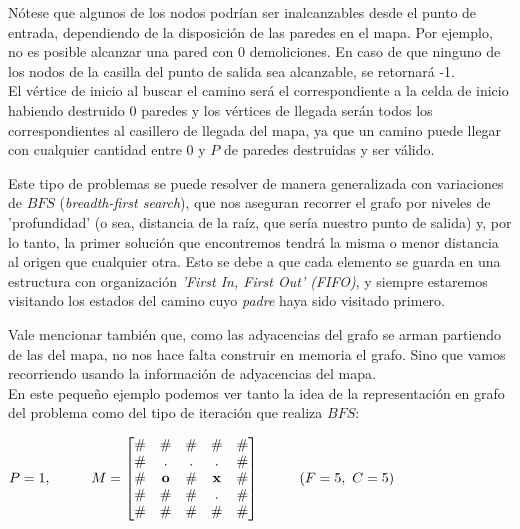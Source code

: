Nótese que algunos de los nodos podrían ser inalcanzables desde el punto de entrada, dependiendo de la disposición de las paredes en el mapa. Por ejemplo, no es posible alcanzar una pared con 0 demoliciones. En caso de que ninguno de los nodos de la casilla del punto de salida sea alcanzable, se retornará -1.
\\

El vértice  de inicio al buscar el camino será el correspondiente a la celda de inicio habiendo destruido 0 paredes y los vértices de llegada serán todos los correspondientes al casillero de llegada del mapa, ya que un camino puede llegar con cualquier cantidad entre 0 y $P$ de paredes destruidas y ser válido.

Este tipo de problemas se puede resolver de manera generalizada con variaciones de $BFS$ (\emph{breadth-first search}), que nos aseguran recorrer el grafo por niveles de 'profundidad' (o sea, distancia de la raíz, que sería nuestro punto de salida) y, por lo tanto, la primer solución que encontremos tendrá la misma o menor distancia al origen que cualquier otra. Esto se debe a que cada elemento se guarda en una estructura con organización \emph{'First In, First Out' (FIFO)}, y siempre estaremos visitando los estados del camino cuyo \emph{padre} haya sido visitado primero.

Vale mencionar también que, como las adyacencias del grafo se arman partiendo de las del mapa, no nos hace falta construir en memoria el grafo. Sino que vamos recorriendo usando la información de adyacencias del mapa.
\\

En este pequeño ejemplo podemos ver tanto la idea de la representación en grafo del problema como del tipo de iteración que realiza $BFS$:

    \begin{center}
        $P=1, \kern 1cm
        M =
        \begin{bmatrix}
            \# & \# & \# & \# & \# \\
            \# & . & . & . & \# \\
            \# & \mathbf{o} & \# & \mathbf{x} & \# \\
            \# & \# & \# & . & \# \\
            \# & \# & \# & \# & \#
        \end{bmatrix}
        \kern 1cm
        (F = 5,\ C = 5)
        $

    \end{center}


